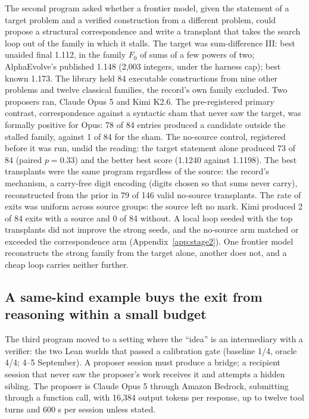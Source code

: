 \documentclass[11pt]{article}
\begin{document}
The second program asked whether a frontier model, given the statement of a
target problem and a verified construction from a different problem, could
propose a structural correspondence and write a transplant that takes the
search loop out of the family in which it stalls. The target was
sum-difference III: best unaided final 1.112, in the family $F_0$ of sums
of a few powers of two; AlphaEvolve's published 1.148 (2{,}003 integers,
under the harness cap); best known 1.173. The library held 84 executable
constructions from nine other problems and twelve classical families, the
record's own family excluded. Two proposers ran, Claude Opus 5 and Kimi
K2.6. The pre-registered primary contrast, correspondence against a
syntactic sham that never saw the target, was formally positive for
Opus: 78 of 84 entries produced a candidate outside the stalled family,
against 1 of 84 for the sham. The no-source control, registered before it
was run, undid the reading: the target statement alone produced 73 of 84
(paired $p=0.33$) and the better best score (1.1240 against 1.1198). The
best transplants were the same program regardless of the source: the
record's mechanism, a carry-free digit encoding (digits chosen so that
sums never carry), reconstructed from the prior in 79 of 146 valid
no-source transplants. The rate of exits was uniform across source
groups: the source left no mark. Kimi produced 2 of 84 exits with a source
and 0 of 84 without. A local loop seeded with the top transplants did not
improve the strong seeds, and the no-source arm matched or exceeded the
correspondence arm (Appendix~\ref{app:stage2}). One frontier model
reconstructs the strong family from the target alone, another does not,
and a cheap loop carries neither further.

\subsection{A same-kind example buys the exit from reasoning within a small budget}
\label{sec:bridges}

The third program moved to a setting where the ``idea'' is an intermediary
with a verifier: the two Lean worlds that passed a calibration gate
(baseline 1/4, oracle 4/4; 4--5 September). A proposer session must
produce a bridge; a recipient session that never saw the proposer's work
receives it and attempts a hidden sibling. The proposer is Claude Opus 5
through Amazon Bedrock, submitting through a function call, with 16{,}384
output tokens per response, up to twelve tool turns and 600 s per session
unless stated.
\end{document}

